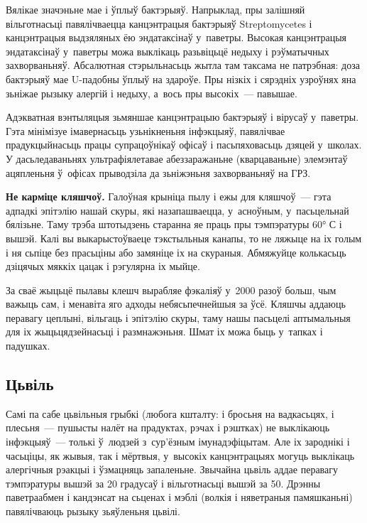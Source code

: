 Вялікае значэньне мае і ўплыў бактэрыяў. Напрыклад, пры залішняй вільготнасьці павялічваецца канцэнтрацыя бактэрыяў Streptomycetes і канцэнтрацыя выдзяляных ёю эндатаксінаў у~паветры. Высокая канцэнтрацыя эндатаксінаў у~паветры можа выклікаць разьвіцьцё недыху і рэўматычных захворваньняў. Абсалютная стэрыльнасьць жытла там таксама не патрэбная: доза бактэрыяў мае U-падобны ўплыў на здароўе. Пры нізкіх і сярэдніх узроўнях яна зьніжае рызыку алергій і недыху, а~вось пры высокіх~--- павышае.

Адэкватная вэнтыляцыя зьмяншае канцэнтрацыю бактэрыяў і вірусаў у~паветры. Гэта мінімізуе імавернасьць узьнікненьня інфэкцыяў, павялічвае прадукцыйнасьць працы супрацоўнікаў офісаў і пасьпяховасьць дзяцей у~школах. У дасьледаваньнях ультрафіялетавае абеззаражаньне (кварцаваньне) элемэнтаў ацяпленьня ў~офісах прыводзіла да зьніжэньня захворваньняў на ГРЗ.


\textbf{Не карміце кляшчоў.} Галоўная крыніца пылу і ежы для кляшчоў~--- гэта адпадкі эпітэлію нашай скуры, які назапашваецца, у~асноўным, у~пасьцельнай бялізьне. Таму трэба штотыдзень старанна яе праць пры тэмпэратуры 60° С і вышэй. Калі вы выкарыстоўваеце тэкстыльныя канапы, то не ляжыце на іх голым і ня сьпіце без прасьціны або замяніце іх на скураныя. Абмяжуйце колькасьць дзіцячых мяккіх цацак і рэгулярна іх мыйце.

За сваё жыцьцё пылавы клешч вырабляе фэкаліяў у~2000 разоў больш, чым важыць сам, і менавіта яго адходы небясьпечнейшыя за ўсё. Кляшчы аддаюць перавагу цеплыні, вільгаць і эпітэлію скуры, таму нашы пасьцелі аптымальныя для іх жыцьцядзейнасьці і размнажэньня. Шмат іх можа быць у~тапках і падушках.

\subsection*{Цьвіль}

Самі па сабе цьвільныя грыбкі (любога кшталту: і бросьня на вадкасьцях, і плесьня~--- пушысты налёт на прадуктах, рэчах і рэштках) не выклікаюць інфэкцыяў~--- толькі ў~людзей з~сур'ёзным імунадэфіцытам. Але іх зароднікі і часьціцы, як жывыя, так і мёртвыя, у~высокіх канцэнтрацыях могуць выклікаць алергічныя рэакцыі і ўзмацняць запаленьне. Звычайна цьвіль аддае перавагу тэмпэратуры вышэй за 20 градусаў і вільготнасьці вышэй за 50. Дрэнны паветраабмен і кандэнсат на сьценах і мэблі (волкія і няветраныя памяшканьні) павялічваюць рызыку зьяўленьня цьвілі.

